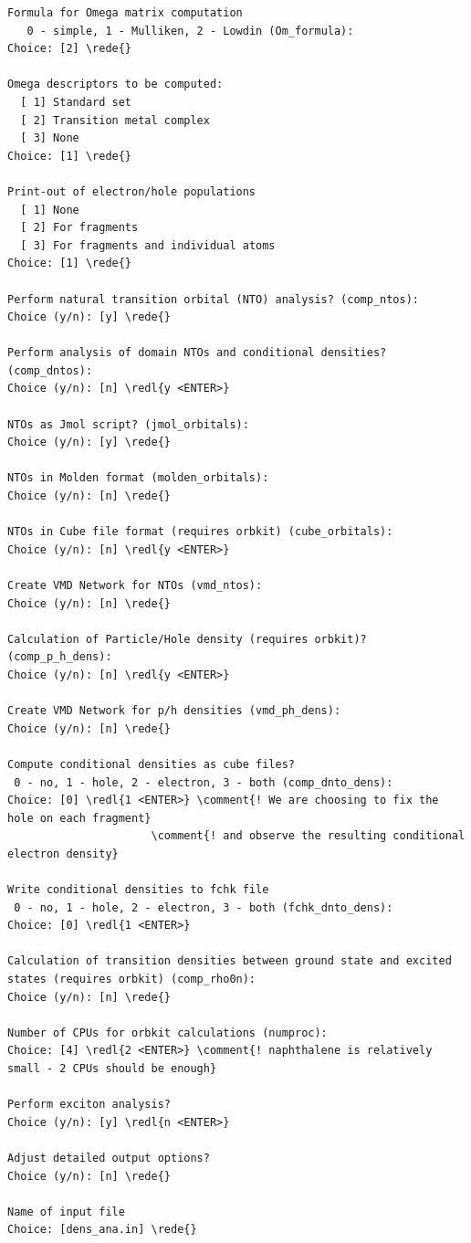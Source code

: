 \documentclass[DIV=12,headings=normal]{scrartcl}
\newcommand{\comment}[1]{\textcolor{blue}{#1}}
\newcommand{\redl}[1]{{\textcolor{red}{\underline{#1}}}}
\newcommand{\rede}[1]{\redl{#1 <ENTER>}}
\begin{document}
\begin{Verbatim}[commandchars=\\\{\}]
Formula for Omega matrix computation
   0 - simple, 1 - Mulliken, 2 - Lowdin (Om_formula):
Choice: [2] \rede{}

Omega descriptors to be computed:
  [ 1] Standard set
  [ 2] Transition metal complex
  [ 3] None
Choice: [1] \rede{}

Print-out of electron/hole populations
  [ 1] None
  [ 2] For fragments
  [ 3] For fragments and individual atoms
Choice: [1] \rede{}

Perform natural transition orbital (NTO) analysis? (comp_ntos):
Choice (y/n): [y] \rede{}

Perform analysis of domain NTOs and conditional densities? (comp_dntos):
Choice (y/n): [n] \redl{y <ENTER>}

NTOs as Jmol script? (jmol_orbitals):
Choice (y/n): [y] \rede{}

NTOs in Molden format (molden_orbitals):
Choice (y/n): [n] \rede{}

NTOs in Cube file format (requires orbkit) (cube_orbitals):
Choice (y/n): [n] \redl{y <ENTER>}

Create VMD Network for NTOs (vmd_ntos):
Choice (y/n): [n] \rede{}

Calculation of Particle/Hole density (requires orbkit)? (comp_p_h_dens):
Choice (y/n): [n] \redl{y <ENTER>}

Create VMD Network for p/h densities (vmd_ph_dens):
Choice (y/n): [n] \rede{}

Compute conditional densities as cube files?
 0 - no, 1 - hole, 2 - electron, 3 - both (comp_dnto_dens):
Choice: [0] \redl{1 <ENTER>} \comment{! We are choosing to fix the hole on each fragment}
                      \comment{! and observe the resulting conditional electron density}

Write conditional densities to fchk file
 0 - no, 1 - hole, 2 - electron, 3 - both (fchk_dnto_dens):
Choice: [0] \redl{1 <ENTER>}

Calculation of transition densities between ground state and excited states (requires orbkit) (comp_rho0n):
Choice (y/n): [n] \rede{}

Number of CPUs for orbkit calculations (numproc):
Choice: [4] \redl{2 <ENTER>} \comment{! naphthalene is relatively small - 2 CPUs should be enough} 

Perform exciton analysis?
Choice (y/n): [y] \redl{n <ENTER>}

Adjust detailed output options?
Choice (y/n): [n] \rede{}

Name of input file
Choice: [dens_ana.in] \rede{} 
\end{Verbatim}
\normalsize
\end{document}
